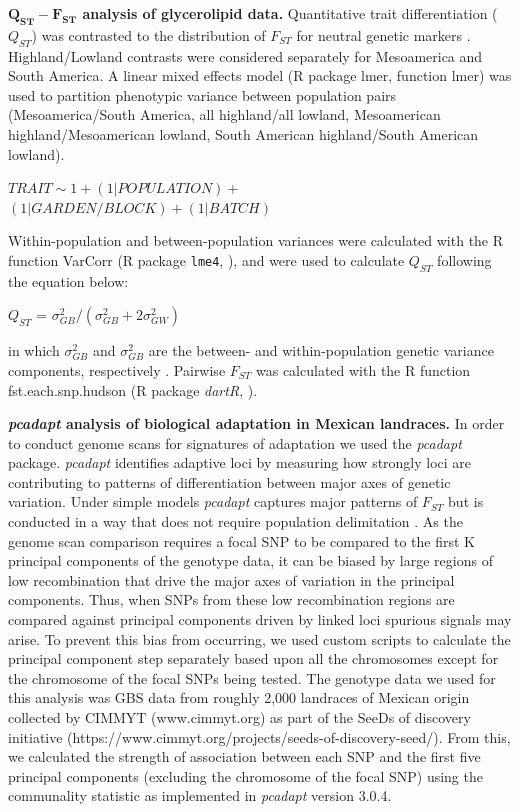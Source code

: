 \documentclass[9pt,twocolumn,twoside,lineno]{BioRxiv}
\begin{document}
\textbf{$\mathbf{Q_{ST}-F_{ST}}$ analysis of glycerolipid data.}
Quantitative trait differentiation ($Q_{ST}$) was contrasted to the distribution of $F_{ST}$ for neutral genetic markers \cite{whitlock2008evolutionary}.
Highland/Lowland contrasts were considered separately for Mesoamerica and South America.
A linear mixed effects model (R package lmer, function lmer) was used to partition phenotypic variance between population pairs (Mesoamerica/South America, all highland/all lowland, Mesoamerican highland/Mesoamerican lowland, South American highland/South American lowland).
\begin{center}
${ TRAIT \sim 1 + (1|POPULATION) + }$\\
${(1|GARDEN/BLOCK) + (1|BATCH)}$
\end{center}
Within-population and between-population variances were calculated with the R function VarCorr (R package \texttt{lme4}, \citealp{bates2014lme4}), and were used to calculate $Q_{ST}$ following the equation below:
\begin{center}
$Q_{ST}$ = \(\sigma^{2}_{GB}/(\sigma^{2}_{GB}+2\sigma^{2}_{GW})\)
\end{center}
\noindent in which $\sigma^{2}_{GB}$ and $\sigma^{2}_{GB}$ are the between- and within-population genetic variance components, respectively \cite{Leinonen2013-ic}.
Pairwise $F_{ST}$ was calculated with the R function fst.each.snp.hudson (R package \textit{dartR}, \citealp{gruber2018dartr}).

\textbf{\textit{pcadapt} analysis of biological adaptation in Mexican landraces.}
In order to conduct genome scans for signatures of adaptation we used the \textit{pcadapt} \cite{Luu2017-ws} package.
\textit{pcadapt} identifies adaptive loci by measuring how strongly loci are contributing to patterns of differentiation between major axes of genetic variation.
Under simple models \textit{pcadapt} captures major patterns of $F_{ST}$  but is conducted in a way that does not require population delimitation \cite{duforet2014genome}.
As the genome scan comparison requires a focal SNP to be compared to the first K principal components of the genotype data, it can be biased by large regions of low recombination that drive the major axes of variation in the principal components.
Thus, when SNPs from these low recombination regions are compared against principal components driven by linked loci spurious signals may arise.
To prevent this bias from occurring, we used custom scripts to calculate the principal component step separately based upon all the chromosomes except for the chromosome of the focal SNPs being tested.
The genotype data we used for this analysis was GBS data from roughly 2,000 landraces of Mexican origin collected by CIMMYT (www.cimmyt.org) as part of the SeeDs of discovery initiative (https://www.cimmyt.org/projects/seeds-of-discovery-seed/).
From this, we calculated the strength of association between each SNP and the first five principal components (excluding the chromosome of the focal SNP) using the communality statistic as implemented in \textit{pcadapt} version 3.0.4.
\end{document}

